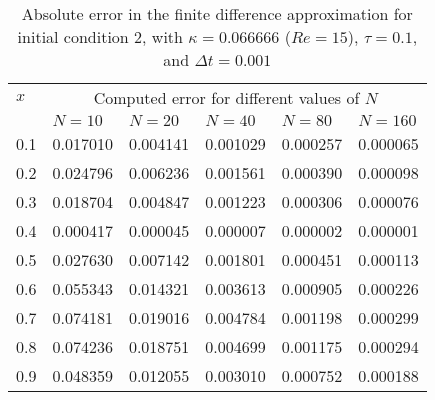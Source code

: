 \documentclass[undefended]{sfuthesis}
\begin{document}
\begin{table}[!h]%
	\centering
	\begin{threeparttable}
		\caption{Absolute error in the finite difference approximation for initial condition 2, with $\kappa = 0.066666$ ($Re = 15$), $\tau = 0.1$, and $\Delta t = 0.001$}
		\begin{tabular}{p{.13\linewidth} p{.15\linewidth} p{.15\linewidth} p{.15\linewidth} p{.15\linewidth} p{.1\linewidth}}
			\toprule
			$x$ & \multicolumn{5}{c}{Computed error for different values of $N$} \\
			\cmidrule{2-6}
			& $N = 10$ & $N = 20$ & $N = 40$ & $N = 80$ & $N = 160$ \\
			\midrule
			0.1 & 0.017010 & 0.004141 & 0.001029 & 0.000257 & 0.000065 \\
			0.2 & 0.024796 & 0.006236 & 0.001561 & 0.000390 & 0.000098 \\
			0.3 & 0.018704 & 0.004847 & 0.001223 & 0.000306 & 0.000076 \\
			0.4 & 0.000417 & 0.000045 & 0.000007 & 0.000002 & 0.000001 \\
			0.5 & 0.027630 & 0.007142 & 0.001801 & 0.000451 & 0.000113 \\
			0.6 & 0.055343 & 0.014321 & 0.003613 & 0.000905 & 0.000226 \\
			0.7 & 0.074181 & 0.019016 & 0.004784 & 0.001198 & 0.000299 \\
			0.8 & 0.074236 & 0.018751 & 0.004699 & 0.001175 & 0.000294 \\
			0.9 & 0.048359 & 0.012055 & 0.003010 & 0.000752 & 0.000188 \\
			\bottomrule
		\end{tabular}
	\end{threeparttable}
\end{table}
\end{document}
